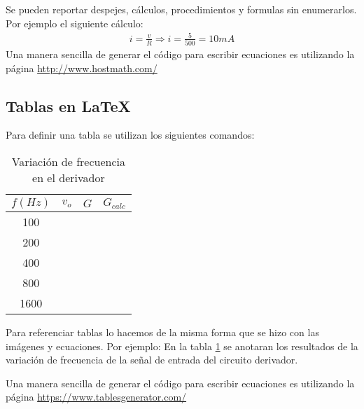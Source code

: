 Se pueden reportar despejes, cálculos, procedimientos y formulas sin enumerarlos. Por ejemplo el siguiente cálculo:
\begin{gather*}
i=\frac{v}{R}\Longrightarrow i=\frac{5}{500}=10 mA
\end{gather*}
Una manera sencilla de generar el código para escribir ecuaciones es utilizando la página \url{http://www.hostmath.com/}
\subsection{Tablas en \LaTeX}
Para definir una tabla se utilizan los siguientes comandos:

\begin{table}[h!] \centering
\begin{tabular}{@{}|c|l|l|l|@{}}
\hline
\multicolumn{1}{|l|}{\textbf{$f (Hz)$}} & \textbf{$v_o$} & \textbf{$G$} & \textbf{$G_{calc}$}\\ \hline
100                                                         &             &         &    \\ \hline
200                                                       &             &           &  \\ \hline
400                                                       &             &            & \\ \hline
800                                                       &             &           &  \\ \hline
1600                                                      &             &           &  \\ \hline
\end{tabular}
\caption{Variación de frecuencia en el derivador}
\label{Tab:P2_DERFREQ}
\end{table}   

Para referenciar tablas lo hacemos de la misma forma que se hizo con las imágenes y ecuaciones. Por ejemplo: En la tabla \ref{Tab:P2_DERFREQ} se anotaran los resultados de la variación de frecuencia de la señal de entrada del circuito derivador.

Una manera sencilla de generar el código para escribir ecuaciones es utilizando la página \url{https://www.tablesgenerator.com/}

